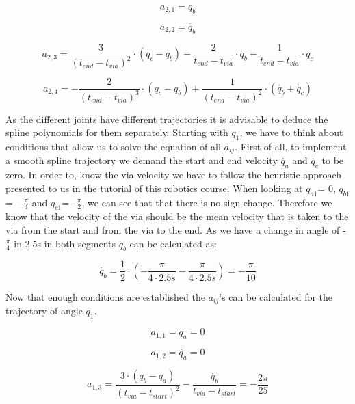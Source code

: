 \begin{equation}
a_{2,1}=q_b
\end{equation}

\begin{equation}
a_{2,2}=\dot{q_b}
\end{equation}

\begin{equation}
a_{2,3}=\frac{3}{(t_{end}-t_{via})^2}\cdot(q_c-q_b)- \frac{2}{t_{end}-t_{via}}\cdot \dot{q_b}- \frac{1}{t_{end}-t_{via}} \cdot \dot{q_c}
\end{equation}

\begin{equation}
a_{2,4}=-\frac{2}{(t_{end}-t_{via})^3}\cdot(q_c-q_b)+ \frac{1}{(t_{end}-t_{via})^2}\cdot(\dot{q_b}+\dot{q_c})
\end{equation}

As the different joints have different trajectories it is advisable to deduce the spline polynomials for them separately. Starting with $q_1$, we have to think about conditions that allow us to solve the equation of all $a_{ij}$. First of all, to implement a smooth spline trajectory we demand the start and end velocity $\dot{q_a}$ and  $\dot{q_c}$ to be zero. 
In order to, know the via velocity we have to follow the heuristic approach presented to us in the tutorial of this robotics course. When looking at $q_{a1}$= 0, $q_{b1}$= $-\frac{\pi}{4}$ and $q_{c1}$=$-\frac{\pi}{2}$, we can see that that there is no sign change. Therefore we know that the velocity of the via should be the mean velocity that is taken to the via from the start and from the via to the end. As we have a change in angle of -$\frac{\pi}{4}$ in 2.5s in both segments $\dot{q_b}$ can be calculated as: 

\begin{equation}
    \dot{q_b}=\frac{1}{2}\cdot(-\frac{\pi}{4\cdot 2.5s} - \frac{\pi}{4\cdot 2.5s}) = -\frac{\pi}{10}
\end{equation}

Now that enough conditions are established the $a_{ij}$'s can be calculated for the trajectory of angle $q_1$.

\begin{equation}
a_{1,1}=q_a = 0
\end{equation}

\begin{equation}
a_{1,2}=\dot{q_a} = 0
\end{equation}

\begin{equation}
a_{1,3}=\frac{3\cdot(q_b-q_a)}{(t_{via}-t_{start})^2}- \frac{\dot{q_b}}{t_{via}-t_{start}}   = -\frac{2\pi}{25}
\end{equation}

